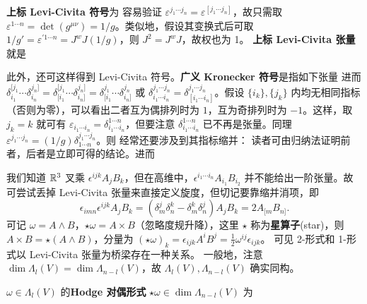 \textbf{上标 Levi-Civita 符号}为
容易验证 $\varepsilon^{j_1\cdots j_n}=\varepsilon^{[j_1\cdots j_n]}$，故只需取 $\varepsilon^{1\cdots n}=\det(g^{\mu\nu})=1/g$。类似地，假设其变换式后可取 $1/g'=\varepsilon^{\prime 1\cdots n}=J^w J(1/g)$，则 $J^2=J^w J$，故权也为 1。
\textbf{上标 Levi-Civita 张量}就是

此外，还可这样得到 Levi-Civita 符号。\textbf{广义 Kronecker 符号}是指如下张量
进而 $\delta_{i_1}^{[j_1}\cdots\delta_{i_n}^{j_n]}=\delta_{[i_1}^{[j_1}\cdots\delta_{i_n]}^{j_n]}=\delta_{[i_1}^{j_1}\cdots\delta_{i_n]}^{j_n}$ 或 $\delta_{i_1\cdots i_n}^{j_1\cdots j_n}=\delta_{[i_1\cdots i_n]}^{j_1\cdots j_n}$。假设 $\{i_k\},\{j_k\}$ 内均无相同指标（否则为零），可以看出二者互为偶排列时为 $1$，互为奇排列时为 $-1$。这样，取 $j_k=k$ 就可有 $\varepsilon_{i_1\cdots i_n}=\delta_{i_1\cdots i_n}^{1\cdots n}$，但要注意 $\delta_{i_1\cdots i_n}^{1\cdots n}$ 已不再是张量。同理 $\varepsilon^{j_1\cdots j_n}=(1/g)\delta^{j_1\cdots j_n}_{1\cdots n}$。则
经常还要涉及到其指标缩并：
读者可由归纳法证明前者，后者是立即可得的结论。进而

我们知道 $\mathbb{R}^3$ 叉乘 $\epsilon^{ijk} A_j B_k$，但在高维中，$\epsilon^{i_1\cdots i_n} A_{i_1} B_{i_2}$ 并不能给出一阶张量。故可尝试丢掉 Levi-Civita 张量来直接定义旋度，但切记要靠缩并消项，即
\[
    \epsilon_{imn}\epsilon^{ijk} A_j B_k=(\delta^j_m\delta^k_n-\delta^k_m\delta^j_n)A_j B_k=2A_{[m} B_{n]}.
\]
可记 $\omega=A\wedge B$，$\star\omega=A\times B$（忽略度规升降），这里 $\star$ 称为\textbf{星算子}(star)，则 $A\times B=\star(A\wedge B)$，分量为 $(\star\omega)_k=\epsilon_{ijk} A^{i}B^{j}=\frac{1}{2}\omega^{ij}\epsilon_{ijk}$。
可见 2-形式和 1-形式以 Levi-Civita 张量为桥梁存在一种关系。
一般地，注意 $\dim\Lambda_l(V)=\dim\Lambda_{n-l}(V)$，故 $\Lambda_l(V),\Lambda_{n-l}(V)$ 确实同构。
\begin{definition}
    $\omega\in\Lambda_l(V)$ 的\textbf{Hodge 对偶形式} $\star\omega\in\dim\Lambda_{n-l}(V)$ 为
\end{definition}

